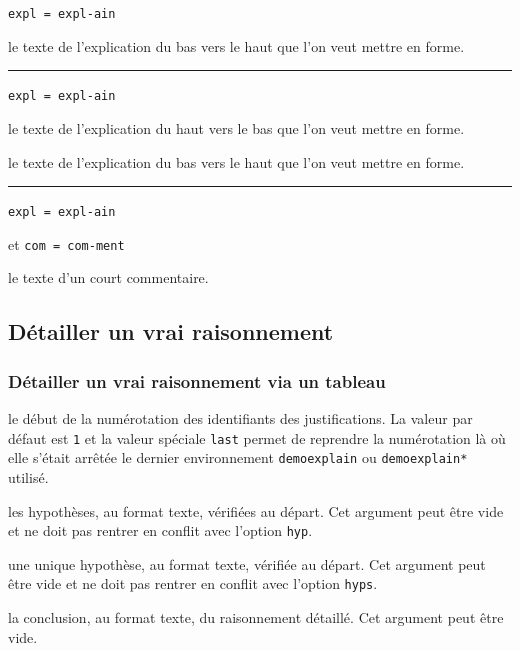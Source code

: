 \documentclass[12pt,a4paper]{book}
\newcommand\env[1]{\texttt{#1}}
\theoremstyle{definition}
\newcommand\separation{
	\medskip
	\hfill\rule{0.5\textwidth}{0.75pt}\hfill
	\medskip
}
\newcommand\mwhyprefix[2]{%
	\texttt{#1 = #1-#2}%
}
\begin{document}
{{ \hfill \mwhyprefix{expl}{ain}

\IDarg{} le texte de l'explication du bas vers le haut que l'on veut mettre en forme.


\separation


 \hfill \mwhyprefix{expl}{ain}

 le texte de l'explication du haut vers le bas que l'on veut mettre en forme.

 le texte de l'explication du bas vers le haut que l'on veut mettre en forme.


\separation


 \hfill \mwhyprefix{expl}{ain}
                            et \mwhyprefix{com}{ment}

\IDarg{} le texte d'un court commentaire.








\subsection{Détailler un \og vrai \fg{} raisonnement}



\subsubsection{Détailler un \og vrai \fg{} raisonnement via un tableau}


 le début de la numérotation des identifiants des justifications.
              La valeur par défaut est \verb+1+ et la valeur spéciale \verb+last+ permet de reprendre la numérotation là où elle s'était arrêtée le dernier environnement \env{demoexplain} ou \env{demoexplain*} utilisé.

 les hypothèses, au format texte, vérifiées au départ.
              Cet argument peut être vide et ne doit pas rentrer en conflit avec l'option \verb+hyp+.

 une unique hypothèse, au format texte, vérifiée au départ.
              Cet argument peut être vide et ne doit pas rentrer en conflit avec l'option \verb+hyps+.

 la conclusion, au format texte, du raisonnement détaillé.
              Cet argument peut être vide.


}}
\end{document}
